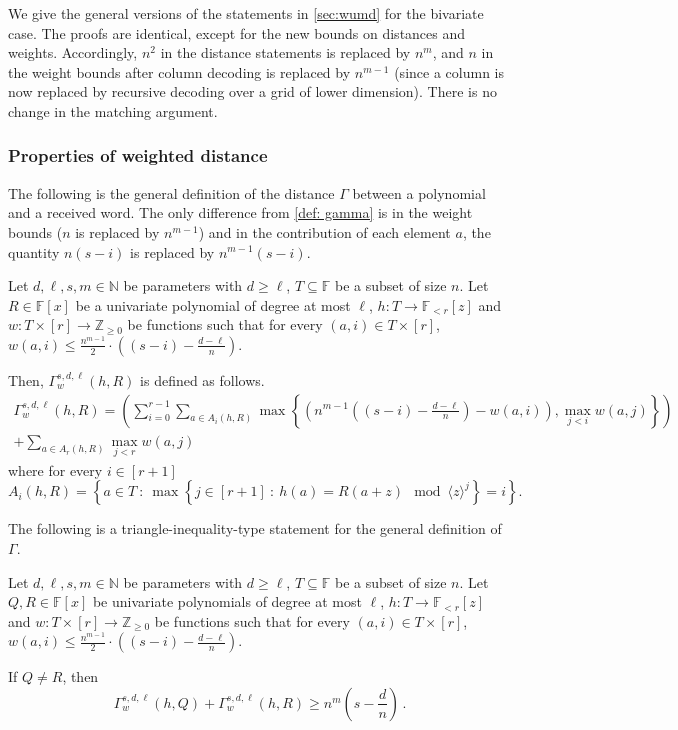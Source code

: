 \documentclass{article}
\def\Integer{\mathbb{Z}}
\def\Natural{\mathbb{N}}
\def\Field{\mathbb{F}}
\let\N\Natural
\let\Z\Integer
\let\F\Field
\def\inbrace#1{\left\{ #1 \right\}}
\def\setdef#1#2{\inbrace{ #1 \ \colon \ #2}}      %
\begin{document}
	We give the general versions of the statements in \cref{sec:wumd} for the bivariate case. The proofs are identical, except for the new bounds on distances and weights. Accordingly, $n^2$ in the distance statements is replaced by $n^m$, and $n$ in the weight bounds after column decoding is replaced by $n^{m-1}$ (since a column is now replaced by recursive decoding over a grid of lower dimension). There is no change in the matching argument. 
	
	\subsubsection{Properties of weighted distance}
	
	The following is the general definition of the distance $\Gamma$
	between a polynomial and a received word. The only difference from
	\cref{def: gamma} is in the weight bounds ($n$ is replaced by
	$n^{m-1}$) and in the contribution of each element $a$, the quantity $n(s-i)$ is replaced by $n^{m-1}(s-i)$. 
	
	\begin{definition} \label{def:multivariate gamma}
		Let $d, \ell, s, m \in \N$ be parameters with $d \geq \ell$, $T
		\subseteq \F$ be a subset of size $n$. Let $R \in \F[x]$ be a
		univariate polynomial of degree at most $\ell$, $h\colon T \to
		\F_{<r}[z]$ and $w\colon  T \times [r] \to \Z_{\geq 0}$ be functions
		such that for every $(a, i) \in T \times [r]$, $w(a,i) \leq
		\frac{n^{m-1}}{2}\cdot \left((s-i) - \frac{d-\ell}{n}\right)$. 
		
		Then, $\Gamma_w^{s, d, \ell}(h, R)$ is defined as follows. 
		\begin{multline*}
		\Gamma_w^{s, d, \ell}(h, R) =  \left(\sum_{i = 0}^{r-1}\sum_{a \in A_i(h,R)} \max \left\{\left(n^{m-1}\left((s-i) - \frac{d-\ell}{n}\right) - w(a,i)\right), \max_{j < i} w(a, j) \right\}\right)\\
        + \sum_{a\in A_r(h,R)} \max_{j < r} w(a, j)
		\end{multline*}
		where for every $i \in [r+1]$
		\[
		A_i(h,R)=\setdef{a\in T}{\max{\setdef{j\in [r+1]}{h(a)=R(a+z) \mod \langle z\rangle^{j}}}=i}.
		\]
		
	\end{definition}
	
	The following is a triangle-inequality-type statement for the general definition of $\Gamma$. 
	
	\begin{lemma}
		Let $d, \ell, s, m \in \N$ be parameters with $d \geq \ell$, $T
		\subseteq \F$ be a subset of size $n$. Let $Q, R \in \F[x]$ be
		univariate polynomials of degree at most $\ell$, $h\colon T \to
		\F_{<r}[z]$ and $w\colon  T \times [r] \to \Z_{\geq 0}$ be functions
		such that for every $(a, i) \in T \times [r]$, $w(a,i) \leq
		\frac{n^{m-1}}{2}\cdot \left((s-i) - \frac{d-\ell}n\right)$. 
		
		If $Q \neq R$, then 
		\[
		\Gamma_w^{s,d,\ell}(h, Q) + \Gamma_w^{s,d,\ell}(h, R) \geq n^{m}\left(s - \frac{d}n\right) \, .
		\]
	\end{lemma}
	
\end{document}

